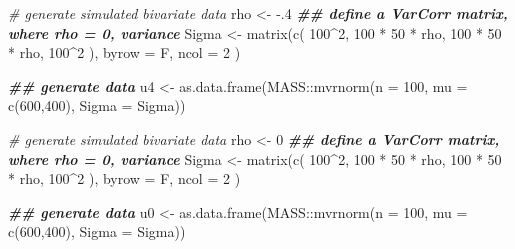 \documentclass[
]{article}
\newenvironment{Shaded}{\begin{snugshade}}{\end{snugshade}}
\newcommand{\AttributeTok}[1]{\textcolor[rgb]{0.77,0.63,0.00}{#1}}
\newcommand{\CommentTok}[1]{\textcolor[rgb]{0.56,0.35,0.01}{\textit{#1}}}
\newcommand{\DecValTok}[1]{\textcolor[rgb]{0.00,0.00,0.81}{#1}}
\newcommand{\DocumentationTok}[1]{\textcolor[rgb]{0.56,0.35,0.01}{\textbf{\textit{#1}}}}
\newcommand{\FunctionTok}[1]{\textcolor[rgb]{0.00,0.00,0.00}{#1}}
\newcommand{\NormalTok}[1]{#1}
\newcommand{\OtherTok}[1]{\textcolor[rgb]{0.56,0.35,0.01}{#1}}
\newcommand{\SpecialCharTok}[1]{\textcolor[rgb]{0.00,0.00,0.00}{#1}}
\begin{document}
\begin{Shaded}
\begin{Highlighting}[]
\CommentTok{\# generate simulated bivariate data}
\NormalTok{rho }\OtherTok{\textless{}{-}} \SpecialCharTok{{-}}\NormalTok{.}\DecValTok{4}
\DocumentationTok{\#\# define a VarCorr matrix, where rho = 0, variance}
\NormalTok{Sigma }\OtherTok{\textless{}{-}} \FunctionTok{matrix}\NormalTok{(}\FunctionTok{c}\NormalTok{(}
  \DecValTok{100}\SpecialCharTok{\^{}}\DecValTok{2}\NormalTok{, }\DecValTok{100} \SpecialCharTok{*} \DecValTok{50} \SpecialCharTok{*}\NormalTok{ rho, }
  \DecValTok{100} \SpecialCharTok{*} \DecValTok{50} \SpecialCharTok{*}\NormalTok{ rho, }\DecValTok{100}\SpecialCharTok{\^{}}\DecValTok{2} 
\NormalTok{  ),}
  \AttributeTok{byrow =}\NormalTok{ F, }\AttributeTok{ncol =} \DecValTok{2}
\NormalTok{  )}

\DocumentationTok{\#\# generate data}
\NormalTok{u4 }\OtherTok{\textless{}{-}} \FunctionTok{as.data.frame}\NormalTok{(MASS}\SpecialCharTok{::}\FunctionTok{mvrnorm}\NormalTok{(}\AttributeTok{n =} \DecValTok{100}\NormalTok{, }\AttributeTok{mu =} \FunctionTok{c}\NormalTok{(}\DecValTok{600}\NormalTok{,}\DecValTok{400}\NormalTok{), }\AttributeTok{Sigma =}\NormalTok{ Sigma))}

\CommentTok{\# generate simulated bivariate data}
\NormalTok{rho }\OtherTok{\textless{}{-}} \DecValTok{0}
\DocumentationTok{\#\# define a VarCorr matrix, where rho = 0, variance}
\NormalTok{Sigma }\OtherTok{\textless{}{-}} \FunctionTok{matrix}\NormalTok{(}\FunctionTok{c}\NormalTok{(}
  \DecValTok{100}\SpecialCharTok{\^{}}\DecValTok{2}\NormalTok{, }\DecValTok{100} \SpecialCharTok{*} \DecValTok{50} \SpecialCharTok{*}\NormalTok{ rho, }
  \DecValTok{100} \SpecialCharTok{*} \DecValTok{50} \SpecialCharTok{*}\NormalTok{ rho, }\DecValTok{100}\SpecialCharTok{\^{}}\DecValTok{2} 
\NormalTok{  ),}
  \AttributeTok{byrow =}\NormalTok{ F, }\AttributeTok{ncol =} \DecValTok{2}
\NormalTok{  )}

\DocumentationTok{\#\# generate data}
\NormalTok{u0 }\OtherTok{\textless{}{-}} \FunctionTok{as.data.frame}\NormalTok{(MASS}\SpecialCharTok{::}\FunctionTok{mvrnorm}\NormalTok{(}\AttributeTok{n =} \DecValTok{100}\NormalTok{, }\AttributeTok{mu =} \FunctionTok{c}\NormalTok{(}\DecValTok{600}\NormalTok{,}\DecValTok{400}\NormalTok{), }\AttributeTok{Sigma =}\NormalTok{ Sigma))}
\end{Highlighting}
\end{Shaded}
\end{document}
